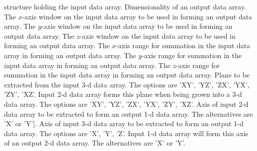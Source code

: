 {\begin{manroutinedescription}
\begin{manparametertable}
  {} structure holding the input data array.
  Dimensionality of an output data array.
  The {$x$}-axis window on the input data array to be used in
  forming an output data array.
  The {$y$}-axis window on the input data array to be used in
  forming an output data array.
  The {$z$}-axis window on the input data array to be used in
  forming an output data array.
  The {$x$}-axis range for summation in the input data array in
  forming an output data array.
  The {$y$}-axis range for summation in the input data array in
  forming an output data array.
  The {$z$}-axis range for summation in the input data array in
  forming an output data array.
  Plane to be extracted from the input 3-d data array.   The options are
  {\mantt 'XY'}, {\mantt 'YZ'}, {\mantt 'ZX'}, {\mantt 'YX'},
  {\mantt 'ZY'}, {\mantt 'XZ'}.
  Input 2-d data array forms this plane when being grown into
  a 3-d data array.   The options are {\mantt 'XY'}, {\mantt 'YZ'},
  {\mantt 'ZX'}, {\mantt 'YX'}, {\mantt 'ZY'}, {\mantt 'XZ'}.
  Axis of input 2-d data array to be extracted to form an output
  1-d data array.   The alternatives are {\mantt 'X'} or {\mantt 'Y']}.
  Axis of input 3-d data array to be extracted to form an output
  1-d data array.  The options are {\mantt 'X'}, {\mantt 'Y'}, {\mantt 'Z'}.
  Input 1-d data array will form this axis of an output 2-d
  data array.   The alternatives are {\mantt 'X'} or {\mantt 'Y'}.
\end{manparametertable}

\end{manroutinedescription}}
